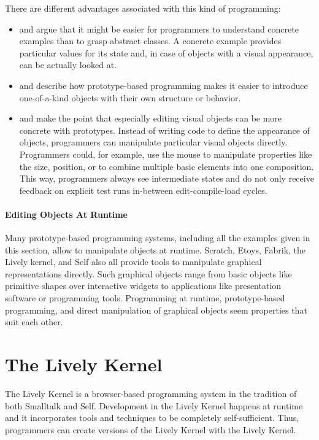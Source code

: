 There are different advantages associated with this kind of programming:
\begin{itemize}
    \item \cite{Taivalsaari1996CVP} and \cite{Ungar1987SPS} argue that it might be easier for programmers to understand concrete examples than to grasp abstract classes. A concrete example provides particular values for its state and, in case of objects with a visual appearance, can be actually looked at.
    \item \cite{Ungar1987SPS} and \cite{Borning1986CVP} describe how prototype-based programming makes it easier to introduce one-of-a-kind objects with their own structure or behavior.
    \item \cite{Borning1986CVP} and \cite{Maloney1995Mor} make the point that especially editing visual objects can be more concrete with prototypes. Instead of writing code to define the appearance of objects, programmers can manipulate particular visual objects directly. Programmers could, for example, use the mouse to manipulate properties like the size, position, or to combine multiple basic elements into one composition. This way, programmers always see intermediate states and do not only receive feedback on explicit test runs in-between edit-compile-load cycles. 
\end{itemize}

\paragraph{Editing Objects At Runtime}
Many prototype-based programming systems, including all the examples given in this section, allow to manipulate objects at runtime.
Scratch, Etoys, Fabrik, the Lively kernel, and Self also all provide tools to manipulate graphical representations directly.
Such graphical objects range from basic objects like primitive shapes over interactive widgets to applications like presentation software or programming tools.
Programming at runtime, prototype-based programming, and direct manipulation of graphical objects seem properties that suit each other.


\section{The Lively Kernel}

The Lively Kernel is a browser-based programming system in the tradition of both Smalltalk and Self.
Development in the Lively Kernel happens at runtime and it incorporates tools and techniques to be completely self-sufficient.
Thus, programmers can create versions of the Lively Kernel with the Lively Kernel.

